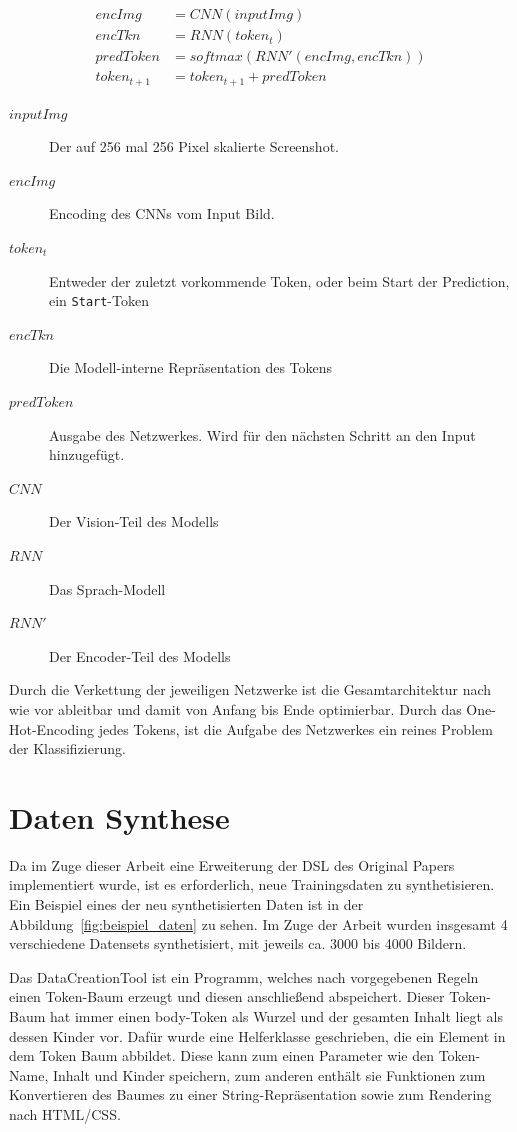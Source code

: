\documentclass[pdftex,a4paper,halfparskip, article]{scrartcl}
\begin{document}
\begin{equation}
\begin{aligned}
encImg  &= CNN(inputImg) \\
encTkn &= RNN(token_t) \\
predToken &= softmax(RNN'(encImg, encTkn)) \\
token_{t+1} &= token_{t+1} + predToken
\end{aligned}
\end{equation}


\begin{description}
	\item[$inputImg$] Der auf 256 mal 256 Pixel skalierte Screenshot.
	\item[$encImg$] Encoding des CNNs vom Input Bild.
	\item[$token_t$] Entweder der zuletzt vorkommende Token, oder beim Start der Prediction, ein \texttt{Start}-Token
	\item[$encTkn$] Die Modell-interne Repräsentation des Tokens
	\item[$predToken$] Ausgabe des Netzwerkes. Wird für den nächsten Schritt an den Input hinzugefügt.
	\\
	\item[$CNN$] Der Vision-Teil des Modells
	\item[$RNN$] Das Sprach-Modell
	\item[$RNN'$] Der Encoder-Teil des Modells
\end{description}

Durch die Verkettung der jeweiligen Netzwerke ist die Gesamtarchitektur nach wie vor ableitbar und damit von Anfang bis Ende optimierbar. Durch das One-Hot-Encoding jedes Tokens, ist die Aufgabe des Netzwerkes ein reines Problem der Klassifizierung.

\section{Daten Synthese}

Da im Zuge dieser Arbeit eine Erweiterung der DSL des Original Papers implementiert wurde, ist es erforderlich, neue Trainingsdaten zu synthetisieren. Ein Beispiel eines der neu synthetisierten Daten ist in der Abbildung~\ref{fig:beispiel_daten} zu sehen. Im Zuge der Arbeit wurden insgesamt 4 verschiedene Datensets synthetisiert, mit jeweils ca. 3000 bis 4000 Bildern. 

Das DataCreationTool ist ein Programm, welches nach vorgegebenen Regeln einen Token-Baum erzeugt und diesen anschließend abspeichert. Dieser Token-Baum hat immer einen body-Token als Wurzel und der gesamten Inhalt liegt als dessen Kinder vor. Dafür wurde eine Helferklasse geschrieben, die ein Element in dem Token Baum abbildet. Diese kann zum einen Parameter wie den Token-Name, Inhalt und Kinder speichern, zum anderen enthält sie Funktionen zum Konvertieren des Baumes zu einer String-Repräsentation sowie zum Rendering nach HTML/CSS. 
\end{document}
